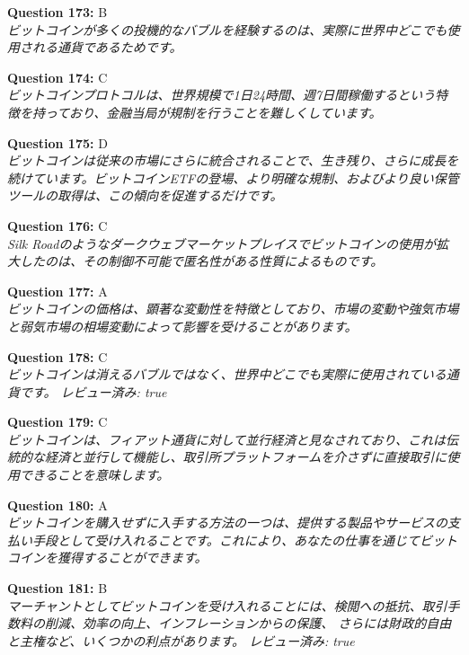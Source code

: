 \documentclass[12pt,a4paper]{article}
\begin{document}
\begin{enumerate}
{{{{{{{{{\item \textbf{Question 173:} B
\\ \textit{ビットコインが多くの投機的なバブルを経験するのは、実際に世界中どこでも使用される通貨であるためです。}

\item \textbf{Question 174:} C
\\ \textit{ビットコインプロトコルは、世界規模で1日24時間、週7日間稼働するという特徴を持っており、金融当局が規制を行うことを難しくしています。}

\item \textbf{Question 175:} D
\\ \textit{ビットコインは従来の市場にさらに統合されることで、生き残り、さらに成長を続けています。ビットコインETFの登場、より明確な規制、およびより良い保管ツールの取得は、この傾向を促進するだけです。}

\item \textbf{Question 176:} C
\\ \textit{Silk Roadのようなダークウェブマーケットプレイスでビットコインの使用が拡大したのは、その制御不可能で匿名性がある性質によるものです。}

\item \textbf{Question 177:} A
\\ \textit{ビットコインの価格は、顕著な変動性を特徴としており、市場の変動や強気市場と弱気市場の相場変動によって影響を受けることがあります。}

\item \textbf{Question 178:} C
\\ \textit{ビットコインは消えるバブルではなく、世界中どこでも実際に使用されている通貨です。 レビュー済み: true}

\item \textbf{Question 179:} C
\\ \textit{ビットコインは、フィアット通貨に対して並行経済と見なされており、これは伝統的な経済と並行して機能し、取引所プラットフォームを介さずに直接取引に使用できることを意味します。}

\item \textbf{Question 180:} A
\\ \textit{ビットコインを購入せずに入手する方法の一つは、提供する製品やサービスの支払い手段として受け入れることです。これにより、あなたの仕事を通じてビットコインを獲得することができます。}

\item \textbf{Question 181:} B
\\ \textit{マーチャントとしてビットコインを受け入れることには、検閲への抵抗、取引手数料の削減、効率の向上、インフレーションからの保護、 さらには財政的自由と主権など、いくつかの利点があります。 レビュー済み: true}

}}}}}}}}}
\end{enumerate}
\end{document}
